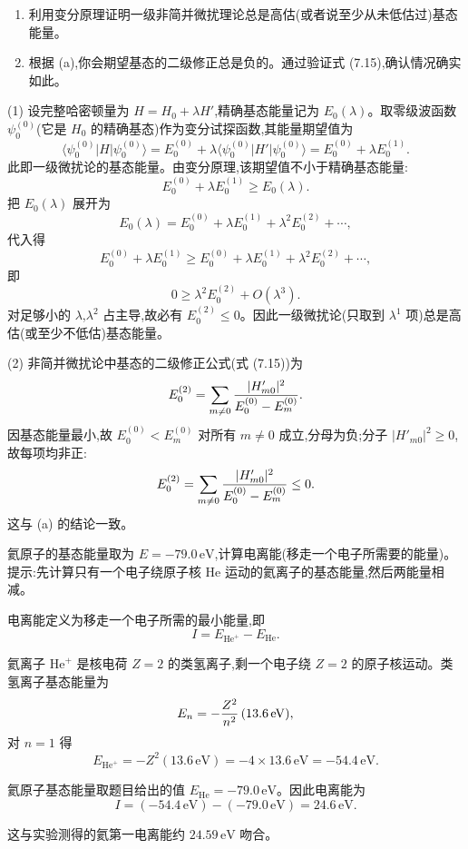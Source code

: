\begin{question}
\begin{enumerate}
\item 利用变分原理证明一级非简并微扰理论总是高估(或者说至少从未低估过)基态能量。
\item 根据 (a),你会期望基态的二级修正总是负的。通过验证式 (7.15),确认情况确实如此。
\end{enumerate}

\par\smallskip
{}

\begin{solution}
(1) 设完整哈密顿量为 $H=H_0+\lambda H'$,精确基态能量记为 $E_0(\lambda)$。取零级波函数 $\psi_0^{(0)}$(它是 $H_0$ 的精确基态)作为变分试探函数,其能量期望值为
\[
\langle\psi_0^{(0)}|H|\psi_0^{(0)}\rangle
=E_0^{(0)}+\lambda\langle\psi_0^{(0)}|H'|\psi_0^{(0)}\rangle
=E_0^{(0)}+\lambda E_0^{(1)}.
\]
此即一级微扰论的基态能量。由变分原理,该期望值不小于精确基态能量:
\[
E_0^{(0)}+\lambda E_0^{(1)}\ge E_0(\lambda).
\]
把 $E_0(\lambda)$ 展开为
\[
E_0(\lambda)=E_0^{(0)}+\lambda E_0^{(1)}+\lambda^2 E_0^{(2)}+\cdots,
\]
代入得
\[
E_0^{(0)}+\lambda E_0^{(1)}\ge E_0^{(0)}+\lambda E_0^{(1)}+\lambda^2 E_0^{(2)}+\cdots,
\]
即
\[
0\ge\lambda^2 E_0^{(2)}+O(\lambda^3).
\]
对足够小的 $\lambda$,$\lambda^2$ 占主导,故必有 $E_0^{(2)}\le0$。因此一级微扰论(只取到 $\lambda^1$ 项)总是高估(或至少不低估)基态能量。

(2) 非简并微扰论中基态的二级修正公式(式 (7.15))为
\[
E_0^{(2)}=\sum_{m\neq0}{|H'_{m0}|^2\over E_0^{(0)}-E_m^{(0)}}.
\]
因基态能量最小,故 $E_0^{(0)}<E_m^{(0)}$ 对所有 $m\ne0$ 成立,分母为负;分子 $|H'_{m0}|^2\ge0$,故每项均非正:
\[
E_0^{(2)}=\sum_{m\neq0}{|H'_{m0}|^2\over E_0^{(0)}-E_m^{(0)}}\le0.
\]
这与 (a) 的结论一致。
\end{solution}
\end{question}

\begin{question}
氦原子的基态能量取为 $E=-79.0\,\mathrm{eV}$,计算电离能(移走一个电子所需要的能量)。提示:先计算只有一个电子绕原子核 He 运动的氦离子的基态能量,然后两能量相减。
\begin{solution}
电离能定义为移走一个电子所需的最小能量,即
\[
I=E_{\mathrm{He}^+}-E_{\mathrm{He}}.
\]

氦离子 $\mathrm{He}^+$ 是核电荷 $Z=2$ 的类氢离子,剩一个电子绕 $Z=2$ 的原子核运动。类氢离子基态能量为
\[
E_n=-{Z^2\over n^2}\,(13.6\,\mathrm{eV}),
\]
对 $n=1$ 得
\[
E_{\mathrm{He}^+}=-Z^2(13.6\,\mathrm{eV})=-4\times13.6\,\mathrm{eV}=-54.4\,\mathrm{eV}.
\]

氦原子基态能量取题目给出的值 $E_{\mathrm{He}}=-79.0\,\mathrm{eV}$。因此电离能为
\[
I=(-54.4\,\mathrm{eV})-(-79.0\,\mathrm{eV})
=\boxed{24.6\,\mathrm{eV}}.
\]

这与实验测得的氦第一电离能约 $24.59\,\mathrm{eV}$ 吻合。
\end{solution}
\end{question}

